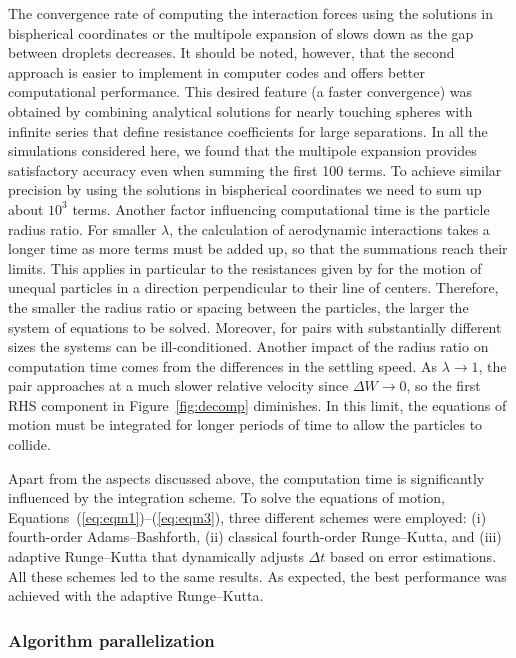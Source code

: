 \documentclass[../thesis.tex]{subfiles}
\begin{document}
The convergence rate of computing the interaction forces using the solutions in bispherical coordinates or the multipole expansion of \cite{JO84} slows down as the gap between droplets decreases. It should be noted, however, that the second approach is easier to implement in computer codes and offers better computational performance. This desired feature (a faster convergence) was obtained by combining analytical solutions for nearly touching spheres with infinite series that define resistance coefficients for large separations. In all the simulations considered here, we found that the multipole expansion provides satisfactory accuracy even when summing the first 100 terms. To achieve similar precision by using the solutions in bispherical coordinates we need to sum up about $10^3$ terms. Another factor influencing computational time is the particle radius ratio. For smaller $\lambda$, the calculation of aerodynamic interactions takes a longer time as more terms must be added up, so that the summations reach their limits. This applies in particular to the resistances given by \cite{ONM70} for the motion of unequal particles in a direction perpendicular to their line of centers. Therefore, the smaller the radius ratio or spacing between the particles, the larger the system of equations to be solved. Moreover, for pairs with substantially different sizes the systems can be ill-conditioned. Another impact of the radius ratio on computation time comes from the differences in the settling speed. As $\lambda \to 1$, the pair approaches at a much slower relative velocity since $\Delta W \to 0$, so the first RHS component in Figure~\ref{fig:decomp} diminishes. In this limit, the equations of motion must be integrated for longer periods of time to allow the particles to collide.

Apart from the aspects discussed above, the computation time is significantly influenced by the integration scheme. To solve the equations of motion, Equations~(\ref{eq:eqm1})--(\ref{eq:eqm3}), three different schemes were employed: (i) fourth-order Adams--Bashforth, (ii) classical fourth-order Runge--Kutta, and (iii) adaptive Runge--Kutta that dynamically adjusts $\Delta t$ based on error estimations. All these schemes led to the same results. As expected, the best performance was achieved with the adaptive Runge--Kutta.

\subsubsection{Algorithm parallelization}
\end{document}
